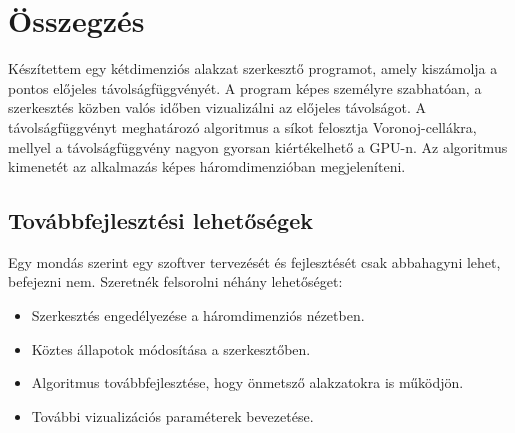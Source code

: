 \chapter{Összegzés}
\label{ch:sum}


Készítettem egy kétdimenziós alakzat szerkesztő programot, amely kiszámolja a pontos előjeles távolságfüggvényét. A program képes személyre szabhatóan, a szerkesztés közben valós időben vizualizálni az előjeles távolságot. A távolságfüggvényt meghatározó algoritmus a síkot felosztja Voronoj-cellákra, mellyel a távolságfüggvény nagyon gyorsan kiértékelhető a GPU-n. Az algoritmus kimenetét az alkalmazás képes háromdimenzióban megjeleníteni.


\section{Továbbfejlesztési lehetőségek}

Egy mondás szerint egy szoftver tervezését és fejlesztését csak abbahagyni lehet, befejezni nem. Szeretnék felsorolni néhány lehetőséget:

\begin{itemize}
    \item Szerkesztés engedélyezése a háromdimenziós nézetben.
    \item Köztes állapotok módosítása a szerkesztőben.
    \item Algoritmus továbbfejlesztése, hogy önmetsző alakzatokra is működjön.
    \item További vizualizációs paraméterek bevezetése.
\end{itemize}
